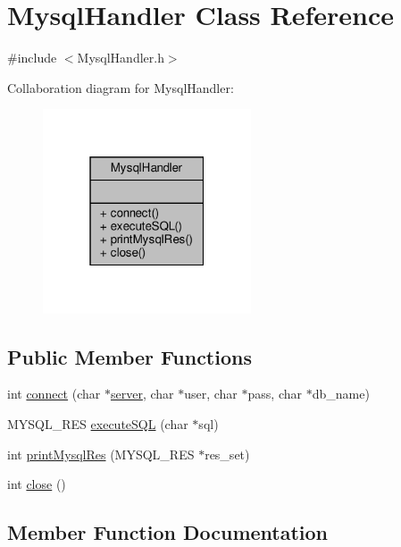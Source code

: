 \hypertarget{classMysqlHandler}{}\section{Mysql\+Handler Class Reference}
\label{classMysqlHandler}


{\ttfamily \#include $<$Mysql\+Handler.\+h$>$}



Collaboration diagram for Mysql\+Handler\+:\nopagebreak
\begin{figure}[H]
\begin{center}
\leavevmode
\includegraphics[width=175pt]{classMysqlHandler__coll__graph}
\end{center}
\end{figure}
\subsection*{Public Member Functions}
\begin{DoxyCompactItemize}
\item 
int \hyperlink{classMysqlHandler_acd74d4ee6a2853d07218cd7a300ee6d2}{connect} (char $\ast$\hyperlink{main_8h_afd1a82c786509e03b540bae82af2c137}{server}, char $\ast$user, char $\ast$pass, char $\ast$db\+\_\+name)
\item 
M\+Y\+S\+Q\+L\+\_\+\+R\+ES \hyperlink{classMysqlHandler_abee4d47196df8c42420fe771508a6ff9}{execute\+S\+QL} (char $\ast$sql)
\item 
int \hyperlink{classMysqlHandler_affb80fba704894dca83d563f6582edc0}{print\+Mysql\+Res} (M\+Y\+S\+Q\+L\+\_\+\+R\+ES $\ast$res\+\_\+set)
\item 
int \hyperlink{classMysqlHandler_aef277d872eb51db9ce2fe66fed348941}{close} ()
\end{DoxyCompactItemize}


\subsection{Member Function Documentation}
\mbox{\label{classMysqlHandler_aef277d872eb51db9ce2fe66fed348941}} 
